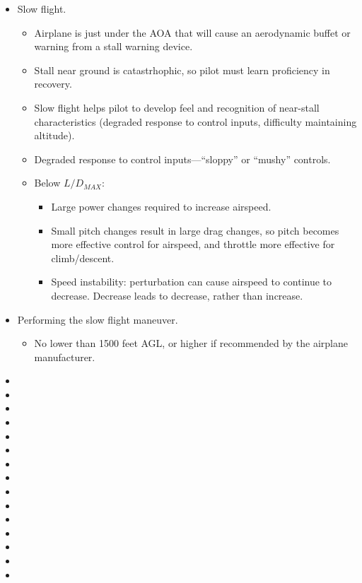 \documentclass[letterpaper,10pt,titlepage]{article}
\begin{document}
\begin{itemize}
\begin{itemize}
	  \end{itemize}
\item Slow flight.
	  \begin{itemize}
	  \item Airplane is just under the AOA that will cause an aerodynamic buffet or warning
	        from a stall warning device.
	  \item Stall near ground is catastrhophic, so pilot must learn proficiency in recovery.
	  \item Slow flight helps pilot to develop feel and recognition of near-stall characteristics (degraded
	        response to control inputs, difficulty maintaining altitude).
	  \item Degraded response to control inputs---``sloppy'' or ``mushy'' controls.
	  \item Below $L/D_{MAX}$:
    	  \begin{itemize}
	      \item Large power changes required to increase airspeed.
	      \item Small pitch changes result in large drag changes, so pitch becomes more effective control for airspeed,
		        and throttle more effective for climb/descent.
	      \item Speed instability:  perturbation can cause airspeed to continue to decrease.  Decrease leads to decrease,
		        rather than increase.
	      \end{itemize}
	  \end{itemize}
\item Performing the slow flight maneuver.
	  \begin{itemize}
	  \item No lower than 1500 feet AGL, or higher if recommended by the airplane manufacturer.
	  \end{itemize}
\item 
\item 
\item 
\item 
\item 
\item 
\item 
\item 
\item 
\item 
\item 
\item 
\item 
\item 
\item 

\end{itemize}
\end{document}
